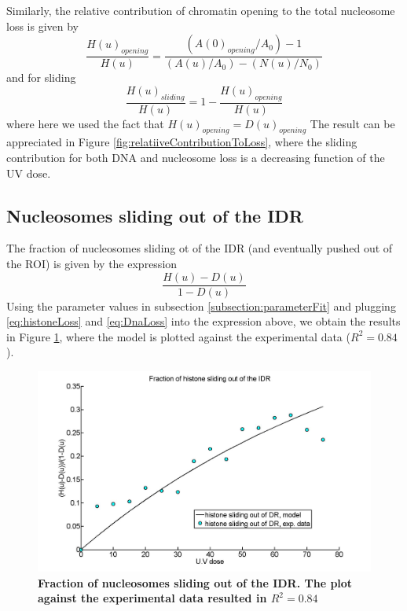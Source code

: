 \documentclass[12pt]{article}
\begin{document}
Similarly, the relative contribution of chromatin opening to the total nucleosome loss is given by 
\begin{equation}\label{eq:openingContributionHistones}
\frac{H(u)_{opening}}{H(u)} =\frac{\left(A(0)_{opening}/A_0\right)-1}{(A(u)/A_0)-(N(u)/N_0)}
\end{equation}
and for sliding
\begin{equation}\label{eq:slidingContributionHistones}
\frac{H(u)_{sliding}}{H(u)} = 1-\frac{H(u)_{opening}}{H(u)} 
\end{equation}
where here we used the fact that $H(u)_{opening}=D(u)_{opening}$
The result can be appreciated in Figure \ref{fig:relatiiveContributionToLoss}, where the sliding contribution for both DNA and nucleosome loss is a decreasing function of the UV dose. 

\subsection{Nucleosomes sliding out of the IDR}
The fraction of nucleosomes sliding ot of the IDR (and eventually pushed out of the ROI) is given by the expression 
\begin{equation}
\frac{H(u)-D(u)}{1-D(u)}
\end{equation}
Using the parameter values in subsection \ref{subsection:parameterFit} and plugging \ref{eq:histoneLoss} and \ref{eq:DnaLoss} into the expression above, we obtain the results in Figure \ref{fig:fractionSlidingOutOfIDR}, where the model is plotted against the experimental data ($R^2=0.84$). 

\begin{figure}[H]
\centering
\includegraphics[width=0.5\linewidth, height=0.3\textheight]{fractionSlidingOutOfIDR}
\caption{\textbf{Fraction of nucleosomes sliding out of the IDR. The plot against the experimental data resulted in $R^2=0.84$ }}
\label{fig:fractionSlidingOutOfIDR}
\end{figure}
\end{document}
